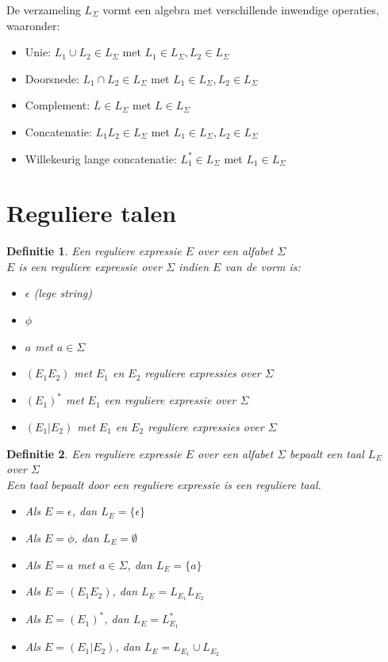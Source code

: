 \documentclass[a4paper]{article}
\newtheorem{tdefinitie}{Definitie}[section]
\newenvironment{definitie}[1]%
  {\begin{mdframed}[backgroundcolor=silver,
    topline=false,
    rightline=false,
    leftline=false,
    bottomline=false]\begin{tdefinitie}#1\\\normalfont}%
  {\end{tdefinitie}\end{mdframed}}
\begin{document}
De verzameling $L_\Sigma$ vormt een algebra met verschillende inwendige operaties, waaronder:
\begin{itemize}
\item Unie: $L_1 \cup L_2 \in L_\Sigma$ met $L_1 \in L_\Sigma, L_2 \in L_\Sigma$
\item Doorsnede: $L_1 \cap L_2 \in L_\Sigma$ met $L_1 \in L_\Sigma, L_2 \in L_\Sigma$
\item Complement: $\overline{L} \in L_\Sigma$ met $L \in L_\Sigma$
\item Concatenatie: $L_1L_2 \in L_\Sigma$ met $L_1 \in L_\Sigma, L_2 \in L_\Sigma$
\item Willekeurig lange concatenatie: $L_1^* \in L_\Sigma$ met $L_1 \in L_\Sigma$
\end{itemize}

\newpage\section{Reguliere talen}

\begin{definitie}{Een reguliere expressie $E$ over een alfabet $\Sigma$}
  $E$ is een reguliere expressie over $\Sigma$ indien $E$ van de vorm is:
  \begin{itemize}
  \item $\epsilon$ (lege string)
  \item $\phi$
  \item $a$ met $a \in \Sigma$
  \item $(E_1E_2)$ met $E_1$ en $E_2$ reguliere expressies over $\Sigma$
  \item $(E_1)^*$ met $E_1$ een reguliere expressie over $\Sigma$
  \item $(E_1|E_2)$ met $E_1$ en $E_2$ reguliere expressies over $\Sigma$
  \end{itemize}
\end{definitie}

\begin{definitie}{Een reguliere expressie $E$ over een alfabet $\Sigma$ bepaalt een taal $L_E$ over $\Sigma$}
  Een taal bepaalt door een reguliere expressie is een reguliere taal.
  \begin{itemize}
  \item Als $E = \epsilon$, dan $L_E = \{\epsilon\}$
  \item Als $E = \phi$, dan $L_E = \emptyset$
  \item Als $E = a$ met $a \in \Sigma$, dan $L_E = \{a\}$
  \item Als $E = (E_1E_2)$, dan $L_E = L_{E_1}L_{E_2}$
  \item Als $E = (E_1)^*$, dan $L_E = L_{E_1}^*$
  \item Als $E = (E_1|E_2)$, dan $L_E = L_{E_1} \cup L_{E_2}$
  \end{itemize}
\end{definitie}
\end{document}
